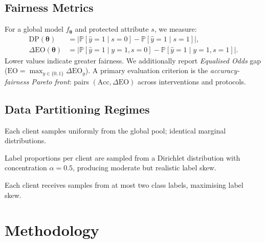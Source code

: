﻿\documentclass{article}
\newcommand{\PP}{\mathbb{P}}
\newcommand{\params}{\boldsymbol{\theta}}%
\newcommand{\DP}{\mathrm{DP}}            %
\newcommand{\DEOpp}{\Delta\mathrm{EO}}   %
\begin{document}
\subsection{Fairness Metrics}
\label{sec:metrics}

For a global model $f_{\params}$ and protected attribute $s$, we
measure:
\begin{align}
  \DP(\params) &= \bigl|\PP[\hat{y}=1 \mid s=0]
                    - \PP[\hat{y}=1 \mid s=1]\bigr|, \label{eq:dp}\\
  \DEOpp(\params) &= \bigl|\PP[\hat{y}=1 \mid y=1, s=0]
                    - \PP[\hat{y}=1 \mid y=1, s=1]\bigr|. \label{eq:eop}
\end{align}
Lower values indicate greater fairness.
We additionally report \emph{Equalised Odds} gap
($\mathrm{EO} = \max_{y \in \{0,1\}} \DEOpp_y$).
A primary evaluation criterion is the \emph{accuracy-fairness
Pareto front}: pairs $(\mathrm{Acc}, \DEOpp)$ across interventions and
protocols.

\subsection{Data Partitioning Regimes}

\begin{description}[leftmargin=1em]
  \item[\textbf{IID.}] Each client samples uniformly from the global
    pool; identical marginal distributions.
  \item[\textbf{Dir($\alpha$=0.5).}] Label proportions per client
    are sampled from a Dirichlet distribution with concentration
    $\alpha{=}0.5$, producing moderate but realistic label
    skew.
  \item[\textbf{Strictly non-IID.}] Each client receives samples
    from at most two class labels, maximising label skew.
\end{description}

\section{Methodology}
\label{sec:method}
\end{document}
